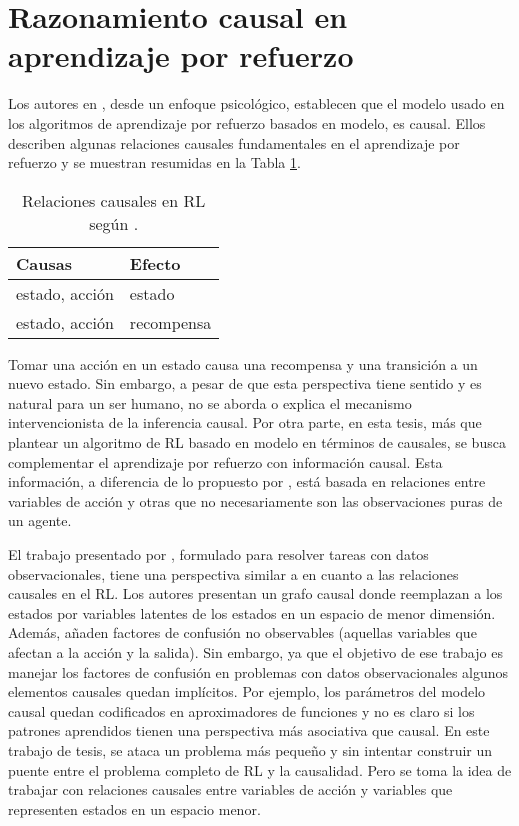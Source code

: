 

\section{Razonamiento causal en aprendizaje por refuerzo}


Los autores en \cite{Gershman2017}, desde un enfoque psicológico, establecen que
el modelo usado en los algoritmos de aprendizaje por refuerzo basados en modelo,
es causal.
Ellos describen algunas relaciones causales fundamentales en el aprendizaje por
refuerzo y se muestran resumidas en la Tabla \ref{table:causal-relationships}. 

\begin{table}[h]
\centering
\caption{Relaciones causales en RL según \cite{Gershman2017}.}
\label{table:causal-relationships}
\begin{tabular}{@{}ll@{}}
\toprule
Causas         & Efecto     \\ \midrule
estado, acción & estado     \\
estado, acción & recompensa \\ \bottomrule
\end{tabular}
\end{table}

Tomar una acción en un estado causa una recompensa y una 
transición a un nuevo estado.
Sin embargo, a pesar de que esta perspectiva tiene sentido y es natural para un ser humano, no se aborda o explica el mecanismo intervencionista de la inferencia causal. 
Por otra parte, en esta tesis, más que plantear un algoritmo de RL 
basado en modelo en términos de causales, se
busca complementar el aprendizaje por refuerzo con información causal.
Esta información, a diferencia de lo propuesto por \cite{Gershman2017}, está
basada en relaciones entre variables de acción y otras que no necesariamente son las observaciones puras de un agente.

El trabajo presentado por \cite{lu2018deconfounding}, formulado para resolver tareas con datos observacionales, tiene una perspectiva similar a \cite{Gershman2017} en cuanto a las relaciones causales en el RL. Los autores
presentan un grafo causal donde reemplazan a los estados 
por variables latentes de los estados en un espacio de menor dimensión. Además, añaden factores
de confusión no observables (aquellas variables que afectan a la acción y la salida). Sin embargo, ya que el objetivo de ese trabajo es manejar los factores de confusión en problemas con datos observacionales algunos elementos causales 
quedan implícitos. Por ejemplo, los parámetros del modelo causal quedan codificados en aproximadores de funciones y no es claro si los patrones aprendidos tienen una perspectiva más asociativa que causal. En este trabajo de tesis, 
se ataca un problema más pequeño y sin intentar construir un puente entre el 
problema completo de RL y la causalidad. Pero se toma la idea de trabajar con
relaciones causales entre variables de acción y variables que representen 
estados en un espacio menor.

